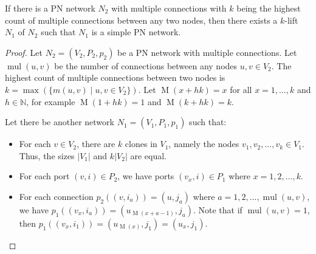 \begin{lemma} \label{lem:lcl_unsolvability:from_klift_to_simple}
    If there is a PN network $N_2$ with multiple connections with $k$ being the highest count of multiple connections between any two nodes, then there exists a $k$-lift $N_1$ of $N_2$ such that $N_1$ is a simple PN network.
\end{lemma}
\begin{proof}
    Let $N_2=(V_2, P_2, p_2)$ be a PN network with multiple connections.
    Let $\operatorname{mul}(u, v)$ be the number of connections between any nodes $u, v \in V_2$.
    The highest count of multiple connections between two nodes is $k=\max (\{ m(u, v) \mid u, v \in V_2\} )$.
    Let $\operatorname{M}(x+hk) = x$ for all $x = 1, ..., k$ and $h\in \mathbb{N}$, for example $\operatorname{M}(1 + hk) = 1$ and $\operatorname{M}(k + hk) = k$.

    Let there be another network $N_1=(V_1, P_1, p_1)$ such that:
    \begin{itemize}
        \item For each $v \in V_2$, there are $k$ clones in $V_1$, namely the nodes $v_1, v_2, ..., v_k \in V_1$.
        Thus, the sizes $|V_1|$ and $k|V_2|$ are equal.
        \item For each port $(v, i) \in P_2$, we have ports $(v_x, i) \in P_1$ where $x=1, 2, ..., k$.

        \item For each connection $p_2((v, i_a)) = (u, j_a)$ where $a = 1, 2, ..., \operatorname{mul}(u, v)$, we have $p_1((v_{x}, i_a)) = (u_{\operatorname{M}(x+a-1)}, j_a)$.
        Note that if $\operatorname{mul}(u, v) = 1$, then $p_1((v_{x}, i_1)) = (u_{\operatorname{M}(x)}, j_1) = (u_{x}, j_1)$.
    \end{itemize}


\end{proof}
